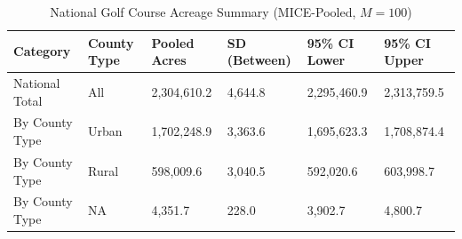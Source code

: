 \begin{table}[H]
\centering
\caption{\label{tab:acreage_summary}National Golf Course Acreage Summary (MICE-Pooled, $M = 100$)}
\centering
\begin{tabular}[t]{llllll}
\toprule
Category & County Type & Pooled Acres & SD (Between) & 95\% CI Lower & 95\% CI Upper\\
\midrule
National Total & All & 2,304,610.2 & 4,644.8 & 2,295,460.9 & 2,313,759.5\\
By County Type & Urban & 1,702,248.9 & 3,363.6 & 1,695,623.3 & 1,708,874.4\\
By County Type & Rural & 598,009.6 & 3,040.5 & 592,020.6 & 603,998.7\\
By County Type & NA & 4,351.7 & 228.0 & 3,902.7 & 4,800.7\\
\bottomrule
\end{tabular}
\end{table}
